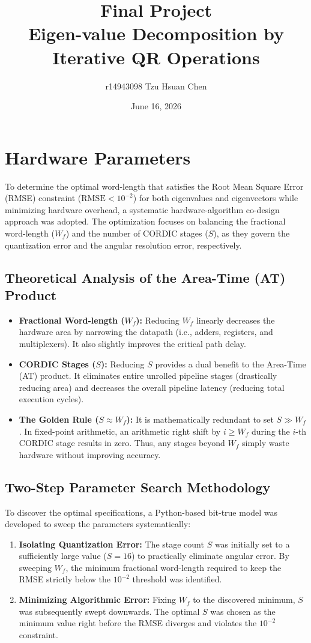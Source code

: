 \documentclass[11pt, a4paper]{article}
\title{Final Project \\ Eigen-value Decomposition by Iterative QR
Operations}
\author{r14943098 Tzu Hsuan Chen}
\date{June 16, 2026}
\begin{document}
\maketitle

\section{Hardware Parameters}
To determine the optimal word-length that satisfies the Root Mean Square Error (RMSE) constraint ($\text{RMSE} < 10^{-2}$) for both eigenvalues and eigenvectors while minimizing hardware overhead, a systematic hardware-algorithm co-design approach was adopted. The optimization focuses on balancing the fractional word-length ($W_f$) and the number of CORDIC stages ($S$), as they govern the quantization error and the angular resolution error, respectively.

\subsection{Theoretical Analysis of the Area-Time (AT) Product}
\begin{itemize}
    \item \textbf{Fractional Word-length ($W_f$):} Reducing $W_f$ linearly decreases the hardware area by narrowing the datapath (i.e., adders, registers, and multiplexers). It also slightly improves the critical path delay.
    \item \textbf{CORDIC Stages ($S$):} Reducing $S$ provides a dual benefit to the Area-Time (AT) product. It eliminates entire unrolled pipeline stages (drastically reducing area) and decreases the overall pipeline latency (reducing total execution cycles). 
    \item \textbf{The Golden Rule ($S \approx W_f$):} It is mathematically redundant to set $S \gg W_f$. In fixed-point arithmetic, an arithmetic right shift by $i \ge W_f$ during the $i$-th CORDIC stage results in zero. Thus, any stages beyond $W_f$ simply waste hardware without improving accuracy.
\end{itemize}

\subsection{Two-Step Parameter Search Methodology}
To discover the optimal specifications, a Python-based bit-true model was developed to sweep the parameters systematically:
\begin{enumerate}
    \item \textbf{Isolating Quantization Error:} The stage count $S$ was initially set to a sufficiently large value ($S = 16$) to practically eliminate angular error. By sweeping $W_f$, the minimum fractional word-length required to keep the RMSE strictly below the $10^{-2}$ threshold was identified.
    \item \textbf{Minimizing Algorithmic Error:} Fixing $W_f$ to the discovered minimum, $S$ was subsequently swept downwards. The optimal $S$ was chosen as the minimum value right before the RMSE diverges and violates the $10^{-2}$ constraint.
\end{enumerate}
\end{document}
